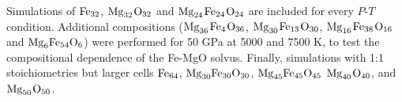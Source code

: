 

Simulations of $\rm{Fe}_{32}$, $\rm{Mg}_{32}$$\rm{O}_{32}$ and
$\rm{Mg}_{24}$$\rm{Fe}_{24}$$\rm{O}_{24}$ are included for every $P$-$T$
condition. Additional compositions
($\rm{Mg}_{36}$$\rm{Fe}_{4}$$\rm{O}_{36}$,
$\rm{Mg}_{30}$$\rm{Fe}_{13}$$\rm{O}_{30}$,
$\rm{Mg}_{16}$$\rm{Fe}_{38}$$\rm{O}_{16}$ and
$\rm{Mg}_{6}\rm{Fe}_{54}\rm{O}_{6}$) were performed for 50 GPa at 5000 and
7500 K, to test the compositional dependence of the Fe-MgO solvus.
Finally, simulations with 1:1 stoichiometries but larger cells
$\rm{Fe}_{64}$, $\rm{Mg}_{30}\rm{Fe}_{30}\rm{O}_{30}$,
$\rm{Mg}_{45}\rm{Fe}_{45}\rm{O}_{45}$ $\rm{Mg}_{40}$$\rm{O}_{40}$, and
$\rm{Mg}_{50}$$\rm{O}_{50}$.



